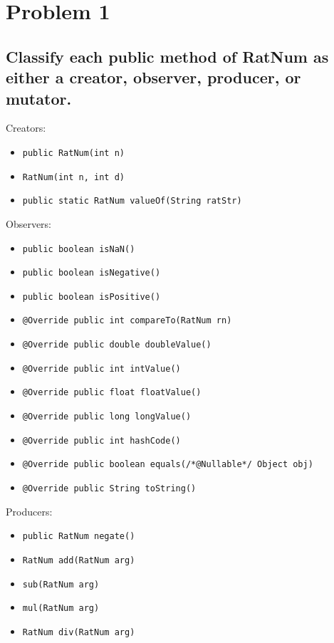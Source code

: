 \documentclass[11pt]{article}
\begin{document}
\section{Problem 1}

\subsection{Classify each public method of RatNum as either a creator, observer, producer, or mutator.}
Creators:
\begin{itemize}
    \item \texttt{public RatNum(int n)}
    \item \texttt{RatNum(int n, int d)}
    \item \texttt{public static RatNum valueOf(String ratStr)}
\end{itemize}

\noindent Observers:
\begin{itemize}
    \item \texttt{public boolean isNaN()}
    \item \texttt{public boolean isNegative()}
    \item \texttt{public boolean isPositive()}
    \item \texttt{@Override public int compareTo(RatNum rn)}
    \item \texttt{@Override public double doubleValue()}
    \item \texttt{@Override public int intValue()}
    \item \texttt{@Override public float floatValue()}
    \item \texttt{@Override public long longValue()}
    \item \texttt{@Override public int hashCode()}
    \item \texttt{@Override public boolean equals(/*@Nullable*/ Object obj)}
    \item \texttt{@Override public String toString()}
\end{itemize}

\noindent Producers:
\begin{itemize}
    \item \texttt{public RatNum negate()}
    \item \texttt{RatNum add(RatNum arg)}
    \item \texttt{sub(RatNum arg)}
    \item \texttt{mul(RatNum arg)}
    \item \texttt{RatNum div(RatNum arg)}

\end{itemize}
\end{document}
